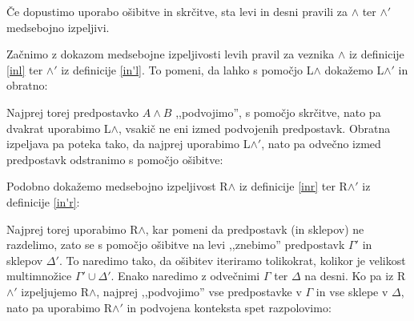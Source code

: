 \begin{lema}
    Če dopustimo uporabo ošibitve in skrčitve, sta levi in desni pravili za $\land$ ter $\land'$ medsebojno izpeljivi.
\end{lema}
\begin{dokaz}
    Začnimo z dokazom medsebojne izpeljivosti levih pravil za veznika $\land$ iz definicije \ref{inl} ter $\land'$ iz definicije \ref{in'l}. To pomeni, da lahko s pomočjo L$\land$ dokažemo L$\land'$ in obratno:
    \begin{prooftree}
    \end{prooftree}
    Najprej torej predpostavko $A \land B$ ,,podvojimo'', s pomočjo skrčitve, nato pa dvakrat uporabimo L$\land$, vsakič ne eni izmed podvojenih predpostavk. Obratna izpeljava pa poteka tako, da najprej uporabimo L$\land'$, nato pa odvečno izmed predpostavk odstranimo s pomočjo ošibitve:
    \begin{prooftree}
    \end{prooftree}
    Podobno dokažemo medsebojno izpeljivost R$\land$ iz definicije \ref{inr} ter R$\land'$ iz definicije \ref{in'r}:
    \begin{prooftree}


    \end{prooftree}
    Najprej torej uporabimo R$\land$, kar pomeni da predpostavk (in sklepov) ne razdelimo, zato se s pomočjo ošibitve na levi ,,znebimo'' predpostavk $\Gamma'$ in sklepov $\Delta'$. To naredimo tako, da ošibitev iteriramo tolikokrat, kolikor je velikost multimnožice $\Gamma'\cup\Delta'$. Enako naredimo z odvečnimi $\Gamma$ ter $\Delta$ na desni. Ko pa iz R$\land'$ izpeljujemo R$\land$, najprej ,,podvojimo'' vse predpostavke v $\Gamma$ in vse sklepe v $\Delta$, nato pa uporabimo R$\land'$ in podvojena konteksta spet razpolovimo:
    \begin{prooftree}
    \end{prooftree}
    \qedhere
\end{dokaz}
